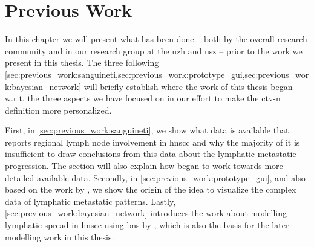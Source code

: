 \documentclass[\relativeRoot/main.tex]{subfiles}
\begin{document}
\chapter{Previous Work}
\label{chap:previous_work}

In this chapter we will present what has been done -- both by the overall research community and in our research group at the \gls{uzh} and \gls{usz} -- prior to the work we present in this thesis. The three following \cref{sec:previous_work:sanguineti,sec:previous_work:prototype_gui,sec:previous_work:bayesian_network} will briefly establish where the work of this thesis began w.r.t. the three aspects we have focused on in our effort to make the \acrfull{ctv-n} definition more personalized.

First, in \cref{sec:previous_work:sanguineti}, we show what data is available that reports regional lymph node involvement in \gls{hnscc} and why the majority of it is insufficient to draw conclusions from this data about the lymphatic metastatic progression. The section will also explain how  began to work towards more detailed available data. Secondly, in \cref{sec:previous_work:prototype_gui}, and also based on the work by , we show the origin of the idea to visualize the complex data of lymphatic metastatic patterns. Lastly, \cref{sec:previous_work:bayesian_network} introduces the work about modelling lymphatic spread in \gls{hnscc} using \glspl{bn} by , which is also the basis for the later modelling work in this thesis.





\end{document}
